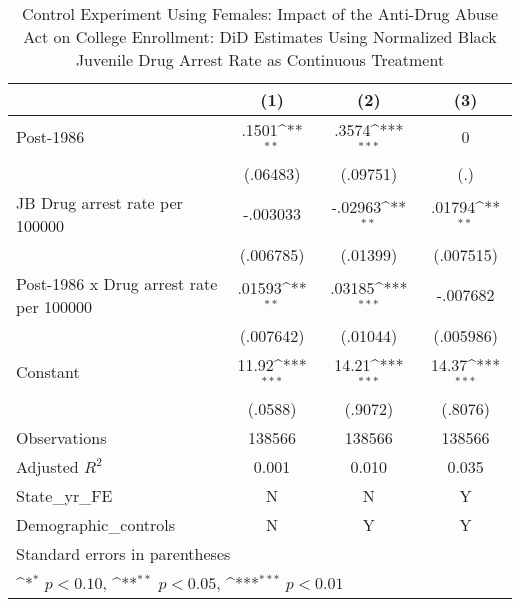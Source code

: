 \begin{table}[htbp]\centering
\def\sym#1{\ifmmode^{#1}\else\(^{#1}\)\fi}
\caption{Control Experiment Using Females: Impact of the Anti-Drug Abuse Act on College Enrollment: DiD Estimates Using Normalized Black Juvenile Drug Arrest Rate as Continuous Treatment}
\begin{tabular}{l*{3}{c}}
\hline\hline
                    &\multicolumn{1}{c}{(1)}         &\multicolumn{1}{c}{(2)}         &\multicolumn{1}{c}{(3)}         \\
\hline
Post-1986           &       .1501\sym{**} &       .3574\sym{***}&           0         \\
                    &    (.06483)         &    (.09751)         &         (.)         \\
[1em]
JB Drug arrest rate per 100000&    -.003033         &     -.02963\sym{**} &      .01794\sym{**} \\
                    &   (.006785)         &    (.01399)         &   (.007515)         \\
[1em]
Post-1986 x Drug arrest rate per 100000&      .01593\sym{**} &      .03185\sym{***}&    -.007682         \\
                    &   (.007642)         &    (.01044)         &   (.005986)         \\
[1em]
Constant            &       11.92\sym{***}&       14.21\sym{***}&       14.37\sym{***}\\
                    &     (.0588)         &     (.9072)         &     (.8076)         \\
\hline
Observations        &      138566         &      138566         &      138566         \\
Adjusted \(R^{2}\)  &       0.001         &       0.010         &       0.035         \\
State\_yr\_FE         &           N         &           N         &           Y         \\
Demographic\_controls&           N         &           Y         &           Y         \\
\hline\hline
\multicolumn{4}{l}{\footnotesize Standard errors in parentheses}\\
\multicolumn{4}{l}{\footnotesize \sym{*} \(p<0.10\), \sym{**} \(p<0.05\), \sym{***} \(p<0.01\)}\\
\end{tabular}
\end{table}
